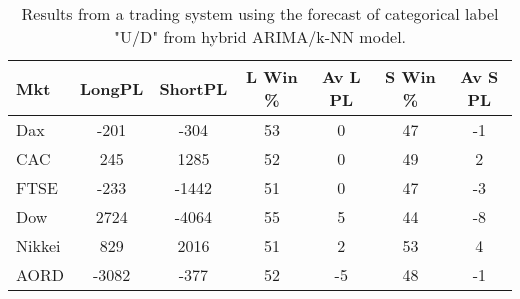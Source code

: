 \begin{table}[ht]
\centering
\caption[Results from a trading system using the forecast of categorical label "U/D" from hybrid ARIMA/k-NN model]{Results from a trading system using the forecast of categorical label "U/D" from hybrid ARIMA/k-NN model.} 
\label{tab:chp_ts:pUD_CAT_arima_knn_sys}
\begin{tabular}{lcccccc}
  \toprule Mkt & LongPL & ShortPL & L Win \% & Av L PL & S Win \% & Av S PL \\ 
  \midrule Dax & -201 & -304 & 53 & 0 & 47 & -1 \\ 
  CAC & 245 & 1285 & 52 & 0 & 49 & 2 \\ 
  FTSE & -233 & -1442 & 51 & 0 & 47 & -3 \\ 
  Dow & 2724 & -4064 & 55 & 5 & 44 & -8 \\ 
  Nikkei & 829 & 2016 & 51 & 2 & 53 & 4 \\ 
  AORD & -3082 & -377 & 52 & -5 & 48 & -1 \\ 
   \bottomrule \end{tabular}
\end{table}
